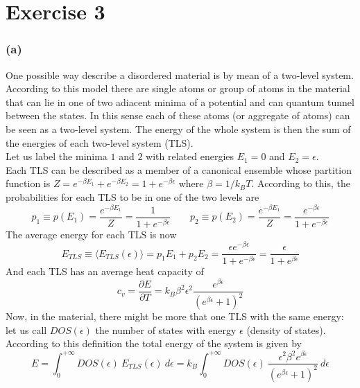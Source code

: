 \documentclass{article}
\begin{document}
\section*{Exercise 3}

\subsubsection*{(a)}
One possible way describe a disordered material is by mean of a two-level system. According to this model there are single atoms or group of atoms in the material that can lie in one of two adiacent minima of 
a potential and can quantum tunnel between the states. In this sense each of these atoms (or aggregate of atoms) can be seen as a two-level system. The energy of the whole system is then the sum of the energies of each two-level system (TLS). \\
Let us label the minima $1$ and $2$ with related energies $E_1=0$ and $E_2=\epsilon$. \\
Each TLS can be described as a member of a canonical ensemble whose partition function is $Z = e^{-\beta E_1} + e^{-\beta E_2} = 1 + e^{-\beta \epsilon}$ where $\beta = 1/k_BT$. According to this, the probabilities for each TLS to be in one of the two levels are
\begin{equation*}
    p_1 \equiv p(E_1) = \frac{e^{-\beta E_1}}{Z} = \frac{1}{1 + e^{-\beta \epsilon}} \qquad p_2 \equiv p(E_2) = \frac{e^{-\beta E_1}}{Z} = \frac{e^{-\beta \epsilon}}{1 + e^{-\beta \epsilon}}
\end{equation*}
The average energy for each TLS is now
\begin{equation*}
    E_{TLS} \equiv \langle E_{TLS}(\epsilon) \rangle = p_1 E_1 + p_2 E_2 = \frac{\epsilon e^{-\beta\epsilon}}{1 + e^{-\beta\epsilon}} = \frac{\epsilon}{1 + e^{\beta\epsilon}}
\end{equation*}
And each TLS has an average heat capacity of
\begin{equation*}
    c_v = \frac{\partial E}{\partial T} = k_B \beta^2 \epsilon^2 \frac{e^{\beta \epsilon}}{(e^{\beta \epsilon} + 1)^2}
\end{equation*}
Now, in the material, there might be more that one TLS with the same energy: let us call $DOS(\epsilon)$  the number of states with energy $\epsilon$ (density of states). According to this definition the total energy of the system is given by 
\begin{equation*}
    E = \int_0^{+\infty} DOS(\epsilon) \ E_{TLS}(\epsilon) \ d\epsilon = k_B \int_0^{+\infty} DOS(\epsilon) \ \frac{\epsilon^2\beta^2 e^{\beta\epsilon}}{(e^{\beta \epsilon}+1)^2} \ d\epsilon
\end{equation*}
\end{document}
